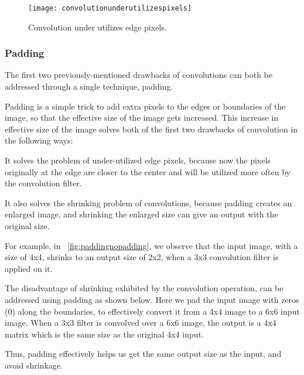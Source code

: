 	\begin{figure}[h]
		\centering
		\texttt{[image: convolutionunderutilizespixels]}
		\caption[Convolution under utilizes edge pixels]{Convolution under utilizes edge pixels.}
		\label{fig:convolutionunderutilizespixels}
	\end{figure}

	\subsubsection{Padding}

	\begin{bulletedlist}
		\item The first two previously-mentioned drawbacks of convolutions can both be addressed through a single technique, padding.
		\item Padding is a simple trick to add extra pixels to the edges or boundaries of the image, so that the effective size of the image gets increased. This increase in effective size of the image solves both of the first two drawbacks of convolution in the following ways:
		\begin{bulletedlist}
			\item It solves the problem of under-utilized edge pixels, because now the pixels originally at the edge are closer to the center and will be utilized more often by the convolution filter.
			\item It also solves the shrinking problem of convolutions, because padding creates an enlarged image, and shrinking the enlarged size can give an output with the original size.
		\end{bulletedlist}
		\item For example, in \figurename~\ref{fig:paddingnopadding}, we observe that the input image, with a size of 4x4, shrinks to an output size of 2x2, when a 3x3 convolution filter is applied on it.
		\item The disadvantage of shrinking exhibited by the convolution operation, can be addressed using padding as shown below.  Here we pad the input image with zeros (0) along the boundaries, to effectively convert it from a 4x4 image to a 6x6 input image.  When a 3x3 filter is convolved over a 6x6 image, the output is a 4x4 matrix which is the same size as the original 4x4 input.
		\item Thus, padding effectively helps us get the same output size as the input, and avoid shrinkage.
	\end{bulletedlist}

